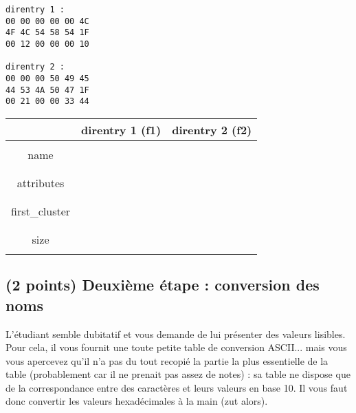 \documentclass[11pt,a4paper]{article}
\begin{document}
\begin{table}[ht!]
  \centering
  \begin{minipage}{0.3\textwidth}
    \centering
\begin{lstlisting}[style=algorithmique]
direntry 1 :
00 00 00 00 00 4C
4F 4C 54 58 54 1F
00 12 00 00 00 10

direntry 2 :
00 00 00 50 49 45
44 53 4A 50 47 1F
00 21 00 00 33 44
\end{lstlisting}
  \end{minipage}
  \hfillx
  \begin{minipage}{0.65\textwidth}
    \centering

\begin{tabular}{ | c | C{4cm} | C{4cm} | }
\hline
 & direntry 1 (f1) & direntry 2 (f2) \\
\hline
 & & \\
name & & \\
 & & \\
\hline
 & & \\
attributes & & \\
 & & \\
\hline
 & & \\
first\_cluster & & \\
 & & \\
\hline
 & & \\
size & & \\
 & & \\
\hline
\end{tabular}

  \end{minipage}
\end{table}

\bigskip

\subsection{(2 points) Deuxième étape : conversion des noms }

L'étudiant semble dubitatif et vous demande de lui présenter des valeurs lisibles.
Pour cela, il vous fournit une toute petite table de conversion ASCII... mais vous vous apercevez qu'il n'a pas du tout recopié la partie la plus essentielle de la table (probablement car il ne prenait pas assez de notes) : sa table ne dispose que de la correspondance entre des caractères et leurs valeurs en base 10.
Il vous faut donc convertir les valeurs hexadécimales à la main (zut alors).
\end{document}
